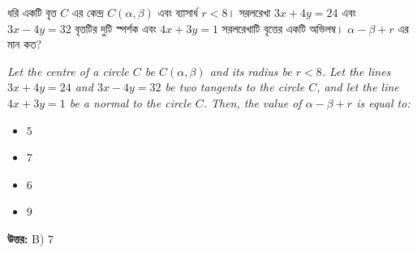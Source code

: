 \documentclass[12pt, a4paper]{article}
\begin{document}
\vspace{2em}

\begin{tcolorbox}[questionbox={প্রশ্ন (Question) 38}]
    \noindent
    ধরি একটি বৃত্ত $C$ এর কেন্দ্র $C(\alpha, \beta)$ এবং ব্যাসার্ধ $r < 8$। সরলরেখা $3x + 4y = 24$ এবং $3x - 4y = 32$ বৃত্তটির দুটি স্পর্শক এবং $4x + 3y = 1$ সরলরেখাটি বৃত্তের একটি অভিলম্ব। $\alpha - \beta + r$ এর মান কত?
    
    \vspace{0.8em}
    \begin{english}
    \noindent\textit{\color{darkgray}
    Let the centre of a circle $C$ be $C(\alpha, \beta)$ and its radius be $r < 8$. Let the lines $3x + 4y = 24$ and $3x - 4y = 32$ be two tangents to the circle $C$, and let the line $4x + 3y = 1$ be a normal to the circle $C$. Then, the value of $\alpha - \beta + r$ is equal to:
    }
    \end{english}
\end{tcolorbox}

\begin{itemize}[label={}, leftmargin=1cm, itemsep=0.5em]
    \item[\textbf{A)}] $5$
    \item[\textbf{B)}] $7$
    \item[\textbf{C)}] $6$
    \item[\textbf{D)}] $9$
\end{itemize}

\vspace{0.5em}
\begin{tcolorbox}[answerbox]
    \textbf{\color{success} উত্তর:} B) $7$
\end{tcolorbox}
\vspace{1em}
\end{document}
